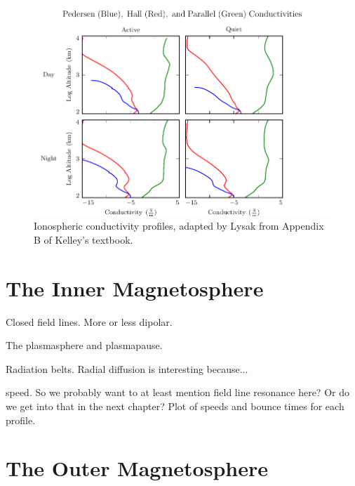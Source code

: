 \begin{figure}[H]
    \centering
    \includegraphics[width=\textwidth]{figures/sigma.pdf}
    \caption[Ionospheric Conductivity Profiles]{
      Ionospheric conductivity profiles, adapted by Lysak\cite{lysak_2013} from Appendix B of Kelley's textbook\cite{kelley_1989}. 
    }
    \label{fig_sigma}
\end{figure}

\section{The Inner Magnetosphere}

Closed field lines. More or less dipolar. 

The plasmasphere and plasmapause. 

Radiation belts. Radial diffusion is interesting because... 

\Alfven speed. So we probably want to at least mention field line resonance here? Or do we get into that in the next chapter? Plot of \Alfven speeds and \Alfven bounce times for each profile. 

\section{The Outer Magnetosphere}


